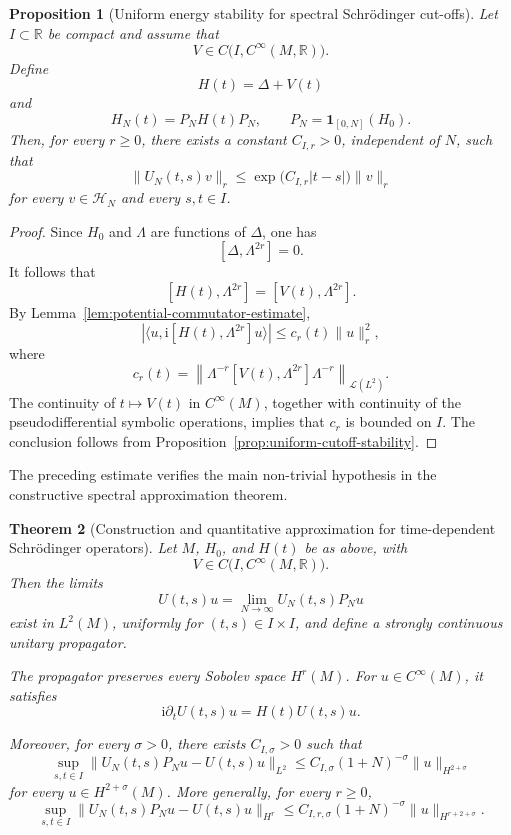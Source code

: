 \documentclass[11pt]{amsart}
\theoremstyle{plain}
\newtheorem{theorem}{Theorem}[section]
\newtheorem{proposition}[theorem]{Proposition}
\theoremstyle{definition}
\theoremstyle{remark}
\begin{document}
\begin{proposition}[Uniform energy stability for spectral Schrödinger
cut-offs]
\label{prop:schrodinger-uniform-stability}
Let \(I\subset\mathbb{R}\) be compact and assume that
\[
V\in C\bigl(I,C^{\infty}(M,\mathbb{R})\bigr).
\]
Define
\[
H(t)=\Delta+V(t)
\]
and
\[
H_{N}(t)=P_{N}H(t)P_{N},
\qquad
P_{N}=\mathbf{1}_{[0,N]}(H_{0}).
\]
Then, for every \(r\geq 0\), there exists a constant \(C_{I,r}>0\),
independent of \(N\), such that
\[
\|U_{N}(t,s)v\|_{r}
\leq
\exp\bigl(C_{I,r}|t-s|\bigr)\|v\|_{r}
\]
for every \(v\in\mathcal{H}_{N}\) and every \(s,t\in I\).
\end{proposition}

\begin{proof}
Since \(H_{0}\) and \(\Lambda\) are functions of \(\Delta\), one has
\[
[\Delta,\Lambda^{2r}]=0.
\]
It follows that
\[
[H(t),\Lambda^{2r}]
=
[V(t),\Lambda^{2r}].
\]
By Lemma~\ref{lem:potential-commutator-estimate},
\[
\left|
\langle u,\mathrm{i}[H(t),\Lambda^{2r}]u\rangle
\right|
\leq
c_{r}(t)\|u\|_{r}^{2},
\]
where
\[
c_{r}(t)
=
\left\|
\Lambda^{-r}[V(t),\Lambda^{2r}]\Lambda^{-r}
\right\|_{\mathcal{L}(L^{2})}.
\]
The continuity of \(t\mapsto V(t)\) in \(C^{\infty}(M)\), together with
continuity of the pseudodifferential symbolic operations, implies that
\(c_{r}\) is bounded on \(I\). The conclusion follows from
Proposition~\ref{prop:uniform-cutoff-stability}.
\end{proof}

The preceding estimate verifies the main non-trivial hypothesis in the
constructive spectral approximation theorem.

\begin{theorem}[Construction and quantitative approximation for
time-dependent Schrödinger operators]
\label{thm:schrodinger-construction-rate}
Let \(M\), \(H_{0}\), and \(H(t)\) be as above, with
\[
V\in C\bigl(I,C^{\infty}(M,\mathbb{R})\bigr).
\]
Then the limits
\[
U(t,s)u
=
\lim_{N\to\infty}U_{N}(t,s)P_{N}u
\]
exist in \(L^{2}(M)\), uniformly for \((t,s)\in I\times I\), and define a
strongly continuous unitary propagator.

The propagator preserves every Sobolev space \(H^{r}(M)\). For
\(u\in C^{\infty}(M)\), it satisfies
\[
\mathrm{i}\partial_{t}U(t,s)u
=
H(t)U(t,s)u.
\]

Moreover, for every \(\sigma>0\), there exists
\(C_{I,\sigma}>0\) such that
\[
\sup_{s,t\in I}
\|U_{N}(t,s)P_{N}u-U(t,s)u\|_{L^{2}}
\leq
C_{I,\sigma}(1+N)^{-\sigma}
\|u\|_{H^{2+\sigma}}
\]
for every \(u\in H^{2+\sigma}(M)\).
More generally, for every \(r\geq 0\),
\[
\sup_{s,t\in I}
\|U_{N}(t,s)P_{N}u-U(t,s)u\|_{H^{r}}
\leq
C_{I,r,\sigma}(1+N)^{-\sigma}
\|u\|_{H^{r+2+\sigma}}.
\]
\end{theorem}
\end{document}
